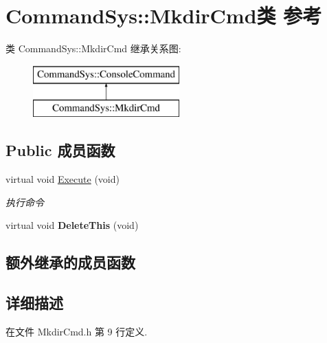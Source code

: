\hypertarget{class_command_sys_1_1_mkdir_cmd}{\section{Command\-Sys\-:\-:Mkdir\-Cmd类 参考}
\label{class_command_sys_1_1_mkdir_cmd}
}
类 Command\-Sys\-:\-:Mkdir\-Cmd 继承关系图\-:\begin{figure}[H]
\begin{center}
\leavevmode
\includegraphics[height=2.000000cm]{class_command_sys_1_1_mkdir_cmd}
\end{center}
\end{figure}
\subsection*{Public 成员函数}
\begin{DoxyCompactItemize}
\item 
virtual void \hyperlink{class_command_sys_1_1_mkdir_cmd_a6a4c23d4e458c2ab12ca9da07625c1e1}{Execute} (void)
\begin{DoxyCompactList}\small\item\em 执行命令 \end{DoxyCompactList}\item 
\hypertarget{class_command_sys_1_1_mkdir_cmd_a7a578419fda8eb5d0a1042ac02ab9213}{virtual void {\bfseries Delete\-This} (void)}\label{class_command_sys_1_1_mkdir_cmd_a7a578419fda8eb5d0a1042ac02ab9213}

\end{DoxyCompactItemize}
\subsection*{额外继承的成员函数}


\subsection{详细描述}


在文件 Mkdir\-Cmd.\-h 第 9 行定义.



